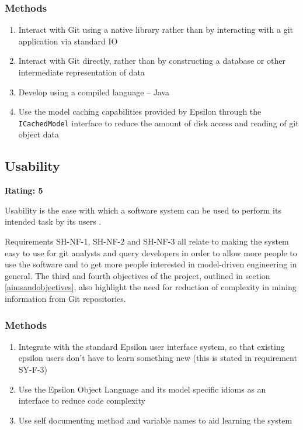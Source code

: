 \documentclass[11pt]{book}
\newcommand{\code}[1]{\texttt{#1}}
\begin{document}
\subsubsection{Methods}
\begin{enumerate}
	\item Interact with Git using a native library rather than by interacting with a git application via standard IO
	\item Interact with Git directly, rather than by constructing a database or other intermediate representation of data
	\item Develop using a compiled language -- Java
	\item Use the model caching capabilities provided by Epsilon through the \code{ICachedModel} interface to reduce the amount of disk access and reading of git object data
\end{enumerate}


\subsection{Usability}
\textbf{Rating: 5}

Usability is the ease with which a software system can be used to perform its intended task by its users \cite{usabilitydefinition}. 

Requirements SH-NF-1, SH-NF-2 and SH-NF-3 all relate to making the system easy to use for git analysts and query developers in order to allow more people to use the software and to get more people interested in model-driven engineering in general. The third and fourth objectives of the project, outlined in section \ref{aimsandobjectives}, also highlight the need for reduction of complexity in mining information from Git repositories.

\subsubsection{Methods}
\begin{enumerate}
	\item Integrate with the standard Epsilon user interface system, so that existing epsilon users don't have to learn something new (this is stated in requirement SY-F-3)
	\item Use the Epsilon Object Language and its model specific idioms as an interface to reduce code complexity
	\item Use self documenting method and variable names to aid learning the system
\end{enumerate}
\end{document}
